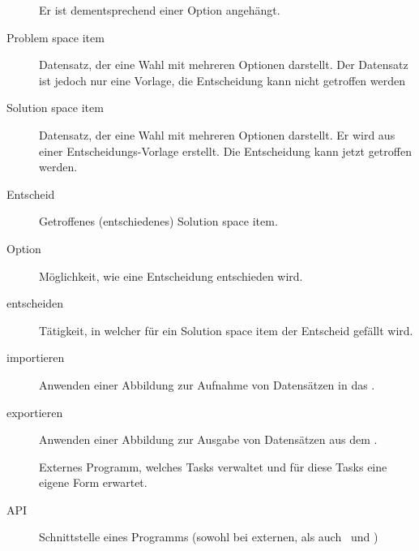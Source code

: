 \begin{description}
				Er ist dementsprechend einer Option angehängt.
			\item[Problem space item] Datensatz, der eine Wahl mit mehreren Optionen darstellt.
				Der Datensatz ist jedoch nur eine Vorlage, die Entscheidung kann nicht getroffen werden
			\item[Solution space item] Datensatz, der eine Wahl mit mehreren Optionen darstellt.
				Er wird aus einer Entscheidungs-Vorlage erstellt.
				Die Entscheidung kann jetzt getroffen werden.
			\item[Entscheid] Getroffenes (entschiedenes) Solution space item.
			\item[Option] Möglichkeit, wie eine Entscheidung entschieden wird.
			\item[entscheiden] Tätigkeit, in welcher für ein Solution space item der Entscheid gefällt wird.
			\item[importieren] Anwenden einer Abbildung zur Aufnahme von Datensätzen in das \eeppi.
			\item[exportieren] Anwenden einer Abbildung zur Ausgabe von Datensätzen aus dem \eeppi.
			\item[\ppt] Externes Programm, welches Tasks verwaltet und für diese Tasks eine eigene Form erwartet.
			\item[API] Schnittstelle eines Programms (sowohl bei externen, als auch \cdar\ und \eeppi)
		\end{description}


